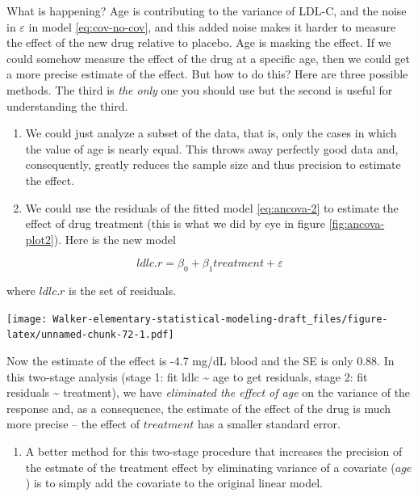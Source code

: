\documentclass[]{book}
\providecommand{\tightlist}{%
  \setlength{\itemsep}{0pt}\setlength{\parskip}{0pt}}
\begin{document}
What is happening? Age is contributing to the variance of LDL-C, and the
noise in \(\varepsilon\) in model \eqref{eq:cov-no-cov}, and this added
noise makes it harder to measure the effect of the new drug relative to
placebo. Age is masking the effect. If we could somehow measure the
effect of the drug at a specific age, then we could get a more precise
estimate of the effect. But how to do this? Here are three possible
methods. The third is \emph{the only} one you should use but the second
is useful for understanding the third.

\begin{enumerate}
\def\labelenumi{\arabic{enumi}.}
\item
  We could just analyze a subset of the data, that is, only the cases in
  which the value of age is nearly equal. This throws away perfectly
  good data and, consequently, greatly reduces the sample size and thus
  precision to estimate the effect.
\item
  We could use the residuals of the fitted model \eqref{eq:ancova-2} to
  estimate the effect of drug treatment (this is what we did by eye in
  figure \ref{fig:ancova-plot2}). Here is the new model
\end{enumerate}

\begin{equation}
ldlc.r = \beta_0 + \beta_1 treatment + \varepsilon
\label{eq:ancova-3}
\end{equation}

where \(ldlc.r\) is the set of residuals.

\texttt{[image: Walker-elementary-statistical-modeling-draft\_files/figure-latex/unnamed-chunk-72-1.pdf]}

Now the estimate of the effect is -4.7 mg/dL blood and the SE is only
0.88. In this two-stage analysis (stage 1: fit ldlc \textasciitilde{}
age to get residuals, stage 2: fit residuals \textasciitilde{}
treatment), we have \emph{eliminated the effect of age} on the variance
of the response and, as a consequence, the estimate of the effect of the
drug is much more precise -- the effect of \(treatment\) has a smaller
standard error.

\begin{enumerate}
\def\labelenumi{\arabic{enumi}.}
\setcounter{enumi}{2}
\tightlist
\item
  A better method for this two-stage procedure that increases the
  precision of the estmate of the treatment effect by eliminating
  variance of a covariate (\(age\)) is to simply add the covariate to
  the original linear model.
\end{enumerate}
\end{document}
